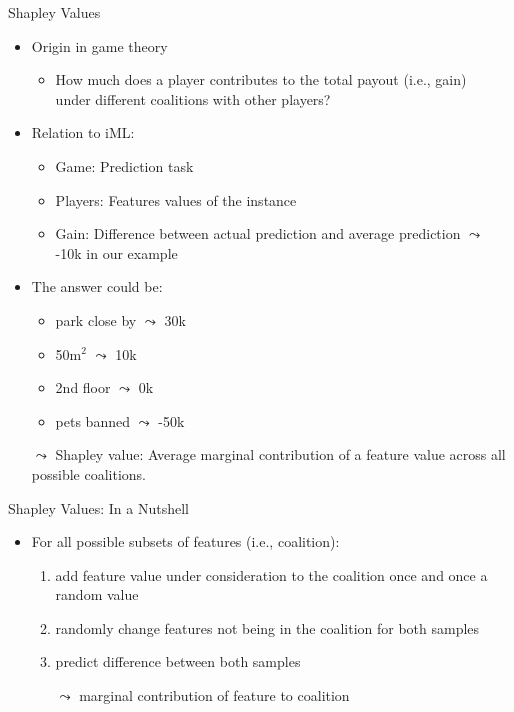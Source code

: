 \documentclass[aspectratio=169]{../latex_main/tntbeamer}  %
\begin{document}
\begin{frame}[c]{Shapley Values}
	
	\begin{itemize}
	    \item Origin in game theory 
	    \begin{itemize}
	        \item How much does a player contributes to the total payout (i.e., gain)\\ under different coalitions with other players?
	    \end{itemize}
	    \pause
	    \item Relation to iML:
	    \begin{itemize}
	        \item Game: Prediction task
	        \item Players: Features values of the instance 
	        \item Gain: Difference between actual prediction and average prediction $\leadsto$ -10k in our example
	    \end{itemize}
    	\pause
    	\smallskip
    	\item The answer could be: 
    	\begin{itemize}
    	    \item park close by $\leadsto$ 30k
    	    \item 50m$^2$ $\leadsto$ 10k
    	    \item 2nd floor $\leadsto$ 0k
    	    \item pets banned $\leadsto$ -50k
    	\end{itemize}
    	\pause
    	\smallskip
    	\item[$\leadsto$] Shapley value: Average marginal contribution of a feature value across all possible coalitions.
	\end{itemize}
\end{frame}

\begin{frame}[c]{Shapley Values: In a Nutshell}
	
	\begin{itemize}
	    \item For all possible subsets of features (i.e., coalition):
	    \begin{enumerate}
	        \item add feature value under consideration to the coalition once and once a random value
	        \item randomly change features not being in the coalition for both samples
	        \item predict difference between both samples
	        \item[$\leadsto$] marginal contribution of feature to coalition
	    \end{enumerate}
	    
	 \end{itemize}
\end{frame}
\end{document}
